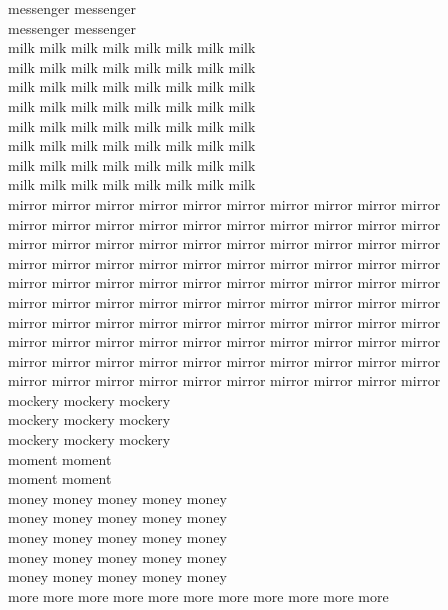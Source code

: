 messenger messenger\\
messenger messenger\\
milk milk milk milk milk milk milk milk\\
milk milk milk milk milk milk milk milk\\
milk milk milk milk milk milk milk milk\\
milk milk milk milk milk milk milk milk\\
milk milk milk milk milk milk milk milk\\
milk milk milk milk milk milk milk milk\\
milk milk milk milk milk milk milk milk\\
milk milk milk milk milk milk milk milk\\
mirror mirror mirror mirror mirror mirror mirror mirror mirror mirror\\
mirror mirror mirror mirror mirror mirror mirror mirror mirror mirror\\
mirror mirror mirror mirror mirror mirror mirror mirror mirror mirror\\
mirror mirror mirror mirror mirror mirror mirror mirror mirror mirror\\
mirror mirror mirror mirror mirror mirror mirror mirror mirror mirror\\
mirror mirror mirror mirror mirror mirror mirror mirror mirror mirror\\
mirror mirror mirror mirror mirror mirror mirror mirror mirror mirror\\
mirror mirror mirror mirror mirror mirror mirror mirror mirror mirror\\
mirror mirror mirror mirror mirror mirror mirror mirror mirror mirror\\
mirror mirror mirror mirror mirror mirror mirror mirror mirror mirror\\
mockery mockery mockery\\
mockery mockery mockery\\
mockery mockery mockery\\
moment moment\\
moment moment\\
money money money money money\\
money money money money money\\
money money money money money\\
money money money money money\\
money money money money money\\
more more more more more more more more more more more\\
